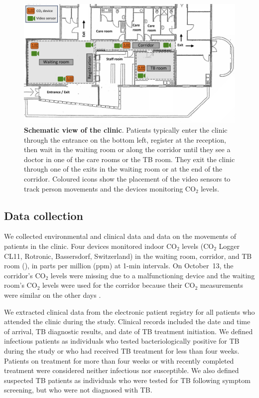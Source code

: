 \documentclass[fleqn,11pt]{wlscirep}
\begin{document}
\begin{figure}[!htpb]
    \centering
    \includegraphics{doc/clinic-schematic-annotated-view.pdf}
    \caption{\textbf{Schematic view of the clinic}. Patients typically enter the clinic through the entrance on the bottom left, register at the reception, then wait in the waiting room or along the corridor until they see a doctor in one of the care rooms or the TB room. They exit the clinic through one of the exits in the waiting room or at the end of the corridor. Coloured icons show the placement of the video sensors to track person movements and the devices monitoring CO$_2$ levels.}
    \label{fig:floor-plan}
\end{figure}


\subsection*{Data collection}

We collected environmental and clinical data and data on the movements of patients in the clinic. Four devices monitored indoor CO$_2$ levels (CO$_2$ Logger CL11, Rotronic, Bassersdorf, Switzerland) in the waiting room, corridor, and TB room (), in parts per million (ppm) at 1-min intervals. On October~13, the corridor's CO$_2$ levels were missing due to a malfunctioning device and the waiting room's CO$_2$ levels were used for the corridor because their CO$_2$ measurements were similar on the other days .

We extracted clinical data from the electronic patient registry for all patients who attended the clinic during the study. Clinical records included the date and time of arrival, TB diagnostic results, and date of TB treatment initiation. We defined infectious patients as individuals who tested bacteriologically positive for TB during the study or who had received TB treatment for less than four weeks. Patients on treatment for more than four weeks or with recently completed treatment were considered neither infectious nor susceptible. We also defined suspected TB patients as individuals who were tested for TB following symptom screening, but who were not diagnosed with TB. 
\end{document}
